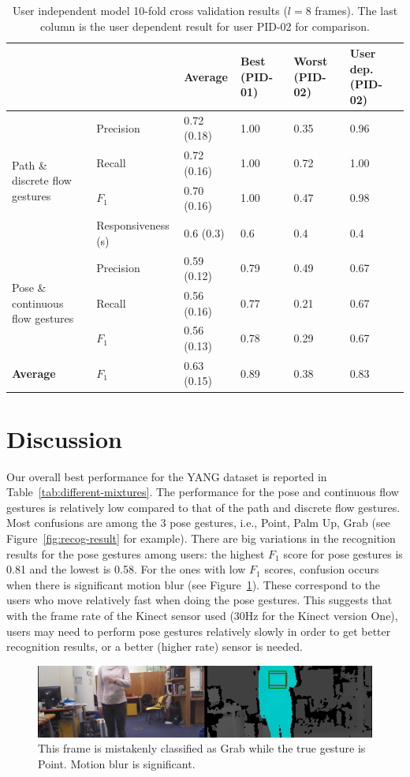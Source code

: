\begin{table}[tbh]
\centering
\begin{tabular}{|p{3cm}|l|l|p{1.9cm}|p{1.9cm}||p{2cm}|}
\hline
& & \textbf{Average} & \textbf{Best (PID-01)} & \textbf{Worst (PID-02)} &
\textbf{User dep. (PID-02)} \\
\hline
\multirow{4}{3cm}{Path \& discrete flow gestures} 
& Precision & 0.72 (0.18) & 1.00 & 0.35 & 0.96 \\
\cline{2-6}
& Recall    & 0.72 (0.16) & 1.00 & 0.72 & 1.00\\
\cline{2-6}
& $F_1$ & 0.70 (0.16) & 1.00 & 0.47 & 0.98 \\
\cline{2-6}
& Responsiveness (s) & 0.6 (0.3)  & 0.6 & 0.4 &  0.4\\
\hline
\multirow{3}{3cm}{Pose \& continuous flow gestures}
& Precision & 0.59 (0.12) & 0.79 & 0.49 & 0.67\\
\cline{2-6}
& Recall & 0.56 (0.16) & 0.77 & 0.21 & 0.67\\
\cline{2-6}
& $F_1$ & 0.56 (0.13)  & 0.78 & 0.29 & 0.67\\
\hline
\textbf{Average} & $F_1$ & 0.63 (0.15) & 0.89 & 0.38 & 0.83\\
\hline
\end{tabular}
\caption{User independent model 10-fold cross validation results ($l = 8$
frames). The last column is the user dependent result for user PID-02 for
comparison.}
\label{tab:user-independent}
\end{table}

\section{Discussion}
Our overall best performance for the YANG dataset is reported in
Table~\ref{tab:different-mixtures}. The performance for the pose and
continuous flow gestures is relatively low compared to that of the path and
discrete flow gestures. Most
confusions are among the 3 pose gestures, i.e., Point, Palm Up, Grab (see
Figure~\ref{fig:recog-result} for example).
There are big variations in the recognition results for the pose gestures among users: the highest $F_1$ score for pose gestures is 0.81
and the lowest is 0.58. For the ones with low $F_1$ scores, confusion occurs
when there is significant motion blur (see Figure~\ref{fig:point_grab}). These
correspond to the users who move relatively fast when doing the pose gestures.
This suggests that with the frame rate of the Kinect sensor used (30Hz for
the Kinect version One), users may need to perform pose gestures relatively
slowly in order to get better recognition results, or a better (higher rate)
sensor is needed.

\begin{figure}[tbh]
\centering
\includegraphics[width=\linewidth]{figures/point_posture_full_image.png}
\caption{This frame is mistakenly classified as Grab while the true gesture
is Point. Motion blur is significant.}
\label{fig:point_grab}
\end{figure}